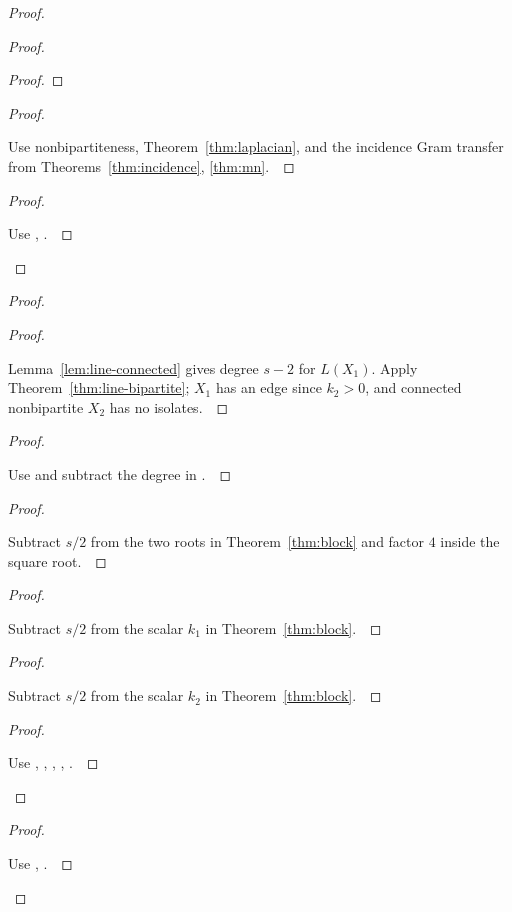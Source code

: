 \documentclass[11pt]{amsart}
\let\qed\relax
\theoremstyle{definition}
\begin{document}
\begin{proof}
\begin{proof}
\begin{proof}
\end{proof}
\begin{proof}
\pf\ \raggedright Use nonbipartiteness, Theorem~\ref{thm:laplacian}, and the incidence Gram transfer from Theorems~\ref{thm:incidence}, \ref{thm:mn}.~\qed
\end{proof}
\qedstep
\begin{proof}
\pf\ \raggedright Use , .~\qed
\end{proof}
\end{proof}
\begin{proof}
\begin{proof}
\pf\ \raggedright Lemma~\ref{lem:line-connected} gives degree $s-2$ for $L(X_1)$. Apply Theorem~\ref{thm:line-bipartite}; $X_1$ has an edge since $k_2>0$, and connected nonbipartite $X_2$ has no isolates.~\qed
\end{proof}
\begin{proof}
\pf\ \raggedright Use  and subtract the degree in .~\qed
\end{proof}
\begin{proof}
\pf\ \raggedright Subtract $s/2$ from the two roots in Theorem~\ref{thm:block} and factor $4$ inside the square root.~\qed
\end{proof}
\begin{proof}
\pf\ \raggedright Subtract $s/2$ from the scalar $k_1$ in Theorem~\ref{thm:block}.~\qed
\end{proof}
\begin{proof}
\pf\ \raggedright Subtract $s/2$ from the scalar $k_2$ in Theorem~\ref{thm:block}.~\qed
\end{proof}
\qedstep
\begin{proof}
\pf\ \raggedright Use , , , , .~\qed
\end{proof}
\end{proof}
\qedstep
\begin{proof}
\pf\ \raggedright Use , .~\qed
\end{proof}
\end{proof}
\end{document}
